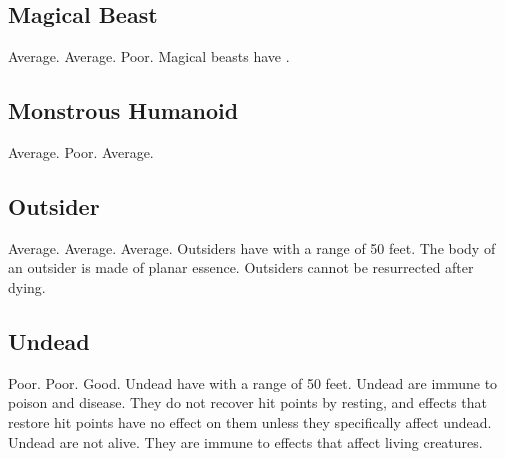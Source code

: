     \subsection{Magical Beast}
         Average.
         Average.
         Poor.
         Magical beasts have .

    \subsection{Monstrous Humanoid}
         Average.
         Poor.
         Average.

    \subsection{Outsider}
         Average.
         Average.
         Average.
         Outsiders have  with a range of 50 feet.
         The body of an outsider is made of planar essence.
        Outsiders cannot be resurrected after dying.

    \subsection{Undead}
         Poor.
         Poor.
         Good.
         Undead have  with a range of 50 feet.
         Undead are immune to poison and disease.
        They do not recover hit points by resting, and effects that restore hit points have no effect on them unless they specifically affect undead.
         Undead are not alive.
        They are immune to effects that affect living creatures.

